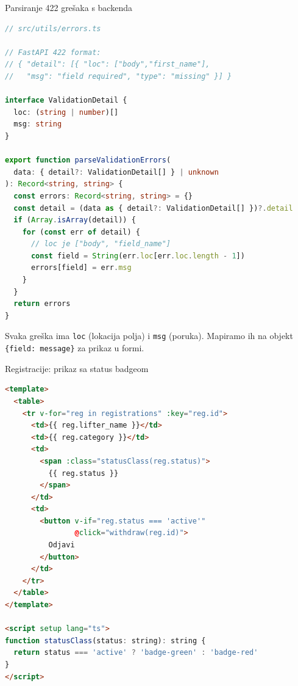 \begin{frame}[fragile,shrink=5]{Parsiranje 422 grešaka s backenda}
\begin{lstlisting}[language=typescript]
// src/utils/errors.ts

// FastAPI 422 format:
// { "detail": [{ "loc": ["body","first_name"],
//   "msg": "field required", "type": "missing" }] }

interface ValidationDetail {
  loc: (string | number)[]
  msg: string
}

export function parseValidationErrors(
  data: { detail?: ValidationDetail[] } | unknown
): Record<string, string> {
  const errors: Record<string, string> = {}
  const detail = (data as { detail?: ValidationDetail[] })?.detail
  if (Array.isArray(detail)) {
    for (const err of detail) {
      // loc je ["body", "field_name"]
      const field = String(err.loc[err.loc.length - 1])
      errors[field] = err.msg
    }
  }
  return errors
}
\end{lstlisting}

\vspace{0.4em}
Svaka greška ima \texttt{loc} (lokacija polja) i \texttt{msg} (poruka). Mapiramo ih na objekt \texttt{\{field: message\}} za prikaz u formi.
\end{frame}

\begin{frame}[fragile,shrink=5]{Registracije: prikaz sa status badgeom}
\begin{lstlisting}[language=html]
<template>
  <table>
    <tr v-for="reg in registrations" :key="reg.id">
      <td>{{ reg.lifter_name }}</td>
      <td>{{ reg.category }}</td>
      <td>
        <span :class="statusClass(reg.status)">
          {{ reg.status }}
        </span>
      </td>
      <td>
        <button v-if="reg.status === 'active'"
                @click="withdraw(reg.id)">
          Odjavi
        </button>
      </td>
    </tr>
  </table>
</template>

<script setup lang="ts">
function statusClass(status: string): string {
  return status === 'active' ? 'badge-green' : 'badge-red'
}
</script>
\end{lstlisting}
\end{frame}

